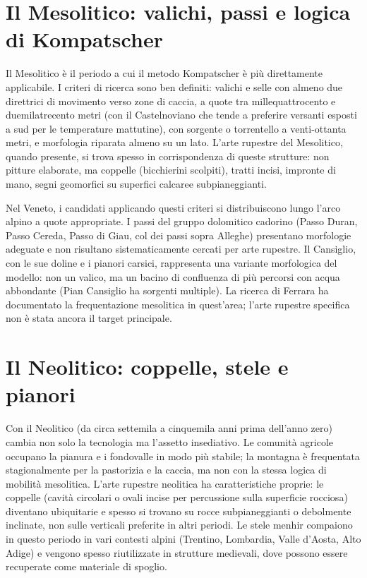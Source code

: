 \section{Il Mesolitico: valichi, passi e logica di Kompatscher}

Il Mesolitico è il periodo a cui il metodo Kompatscher è più direttamente applicabile. I criteri di ricerca sono ben definiti: valichi e selle con almeno due direttrici di movimento verso zone di caccia, a quote tra millequattrocento e duemilatrecento metri (con il Castelnoviano che tende a preferire versanti esposti a sud per le temperature mattutine), con sorgente o torrentello a venti-ottanta metri, e morfologia riparata almeno su un lato. L'arte rupestre del Mesolitico, quando presente, si trova spesso in corrispondenza di queste strutture: non pitture elaborate, ma coppelle (bicchierini scolpiti), tratti incisi, impronte di mano, segni geomorfici su superfici calcaree subpianeggianti.

Nel Veneto, i candidati applicando questi criteri si distribuiscono lungo l'arco alpino a quote appropriate. I passi del gruppo dolomitico cadorino (Passo Duran, Passo Cereda, Passo di Giau, col dei passi sopra Alleghe) presentano morfologie adeguate e non risultano sistematicamente cercati per arte rupestre. Il Cansiglio, con le sue doline e i pianori carsici, rappresenta una variante morfologica del modello: non un valico, ma un bacino di confluenza di più percorsi con acqua abbondante (Pian Cansiglio ha sorgenti multiple). La ricerca di Ferrara ha documentato la frequentazione mesolitica in quest'area; l'arte rupestre specifica non è stata ancora il target principale.

\section{Il Neolitico: coppelle, stele e pianori}

Con il Neolitico (da circa settemila a cinquemila anni prima dell'anno zero) cambia non solo la tecnologia ma l'assetto insediativo. Le comunità agricole occupano la pianura e i fondovalle in modo più stabile; la montagna è frequentata stagionalmente per la pastorizia e la caccia, ma non con la stessa logica di mobilità mesolitica. L'arte rupestre neolitica ha caratteristiche proprie: le coppelle (cavità circolari o ovali incise per percussione sulla superficie rocciosa) diventano ubiquitarie e spesso si trovano su rocce subpianeggianti o debolmente inclinate, non sulle verticali preferite in altri periodi. Le stele menhir compaiono in questo periodo in vari contesti alpini (Trentino, Lombardia, Valle d'Aosta, Alto Adige) e vengono spesso riutilizzate in strutture medievali, dove possono essere recuperate come materiale di spoglio.

